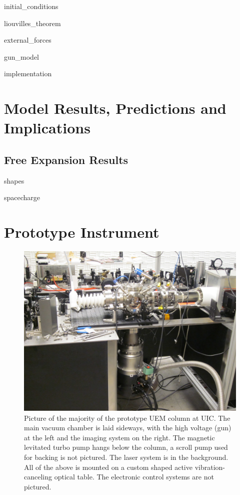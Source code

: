 \documentclass{uicthesi}
\begin{document}
  {initial_conditions}

  {liouvilles_theorem}


  {external_forces}

  {gun_model}

  {implementation}

\chapter{Model Results, Predictions and Implications}

\section{Free Expansion Results}

  {shapes}

  {spacecharge}

\chapter{Prototype Instrument}

  \begin{figure}
    \centering
    \includegraphics{inc/hardware/column.jpg}
    \caption[Picture of the prototype UEM column at UIC]{
      Picture of the majority of the prototype UEM column at UIC.
      The main vacuum chamber is laid sideways, with the high voltage (gun) at the left and the imaging system on the right.
      The magnetic levitated turbo pump hangs below the column, a scroll pump used for backing is not pictured.
      The laser system is in the background.
      All of the above is mounted on a custom shaped active vibration-canceling optical table.
      The electronic control systems are not pictured.
    }
    \label{fig:column-pic}
  \end{figure}
\end{document}
